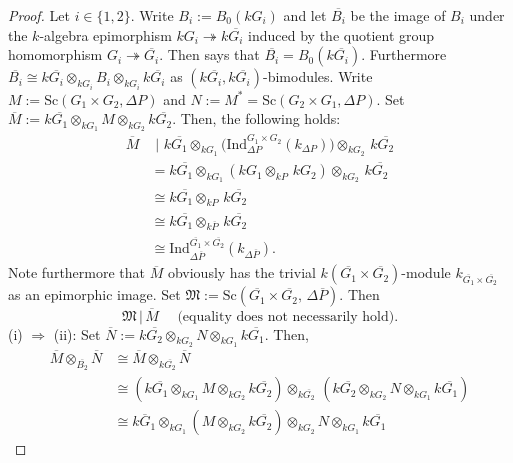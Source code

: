 \documentclass[12pt,a4paper]{amsart}
\theoremstyle{plain}\newtheorem{Theorem}{Theorem}[section]
\theoremstyle{plain}\newtheorem{Conjecture}[Theorem]{Conjecture}
\theoremstyle{plain}\newtheorem{Corollary}[Theorem]{Corollary}
\theoremstyle{plain}\newtheorem{Lemma}[Theorem]{Lemma}
\theoremstyle{plain}\newtheorem{Proposition}[Theorem]{Proposition}
\theoremstyle{definition}\newtheorem{Definition}[Theorem]{Definition}
\theoremstyle{definition}\newtheorem{Example}[Theorem]{Example}
\theoremstyle{definition}\newtheorem{Examples}[Theorem]{Examples}
\theoremstyle{definition}\newtheorem{Remark}[Theorem]{Remark}
\theoremstyle{definition}\newtheorem{Question}[Theorem]{Question}
\theoremstyle{definition}\newtheorem{Notation}[Theorem]{Notation}
\theoremstyle{definition}\newtheorem{Hypothesis}[Theorem]{Hypothesis}
\theoremstyle{definition}\newtheorem{Assumption}[Theorem]{Assumption}
\theoremstyle{definition}\newtheorem{Strategy}[Theorem]{Strategy}
\theoremstyle{definition}\newtheorem{Contents}[Theorem]{Contents}
\theoremstyle{definition}\newtheorem{Computations}[Theorem]{Computations}
\theoremstyle{definition}\newtheorem{Equivalences}[Theorem]{Equivalences}
\theoremstyle{definition}\newtheorem{Notation/Definition}[Theorem]{Notation/Definition}
\theoremstyle{definition}\newtheorem{noth}[Theorem]{}
\theoremstyle{plain}\newtheorem{Step}[Theorem]{Step}
\begin{document}
\begin{proof}
Let $i\in\{1,2\}$. 
Write $B_i:=B_0(kG_i)$ and let $\overline{B_i}$ be the image of $B_i$
under the {$k$-algebra} epimorphism $kG_i\twoheadrightarrow k\overline{G_i}$
induced by the quotient group homomorphism $G_i\twoheadrightarrow\overline{G_i}$.
Then \cite[Chap. 5 Theorem~8.11]{NT89} says that
$\overline{B_i}=B_0(k\overline{G_i})$.
Furthermore
$\overline{B_i}\cong k\overline{G_i}\otimes_{kG_i}B_i\otimes_{kG_i} {k\overline{G_i}}$
as $(k\overline{G_i},k\overline{G_i})$-bimodules.
Write $M:={\mathrm{Sc}}(G_1\times G_2,\Delta P)$ 
and {$N:=M^*={\mathrm{Sc}}(G_2\times G_1,\Delta P)$}. 
Set $\overline M:=k\overline{G_1}\otimes_{kG_1}M\otimes_{kG_2}k\overline{G_2}$.
Then, the following holds:\\
\begin{align*}
\overline M&\,\,\Big|\,\,
k\overline{G_1}\otimes_{kG_1}
\Big( {\mathrm{Ind}}_{\Delta P}^{G_1\times G_2}{(k_{\Delta P})}
\Big)
\otimes_{kG_2}\,k\overline{G_2}
\\&=
k\overline{G_1}\otimes_{kG_1}(kG_1\otimes_{kP}\,kG_2)\otimes_{kG_2}\,k\overline{G_2}
\\&\cong
k\overline{G_1}\otimes_{kP}\,k\overline{G_2}
\\&\cong
k\overline{G_1}\otimes_{k\overline P}\,k\overline{G_2}
\\&\cong 
{\mathrm{Ind}}_{\Delta\overline P}^{\overline{G_1}\times\overline{G_2}}(k_{\Delta\overline P}).
\end{align*}
Note furthermore that 
$\overline M$ obviously has the trivial $k(\overline{G_1}\times\overline{G_2})$-module
$k_{\overline{G_1}\times\overline{G_2}}$ as an epimorphic image.
Set $\mathfrak M:={\mathrm{Sc}}(\overline{G_1}\times\overline{G_2},\,\Delta{\overline P})$.
Then
\begin{equation}\label{Prop3.3(b)} 
\mathfrak M
\,\Big|\,\overline M \quad
\text{ (equality does not necessarily hold)}.
\end{equation}
(i) $\Rightarrow$ (ii):
Set $\overline N:=k\overline{G_2}\otimes_{kG_2}N\otimes_{kG_1}k\overline{G_1}$.
Then, 
\begin{align*}
\overline M\otimes_{\overline{B_2}}\overline N
&\cong
\overline M\otimes_{k\overline{G_2}}\overline N
\\&\cong
(k\overline{G_1}\otimes_{kG_1}M\otimes_{kG_2}k\overline{G_2})\otimes_{k\overline{G_2}}\,
(k\overline{G_2}\otimes_{kG_2}N\otimes_{kG_1}k\overline{G_1})
\\&\cong
k{\overline G_1}\otimes_{kG_1}(M\otimes_{kG_2}k\overline{G_2})\otimes_{kG_2}N\otimes_{kG_1}k\overline{G_1}

\end{align*}
\end{proof}
\end{document}
